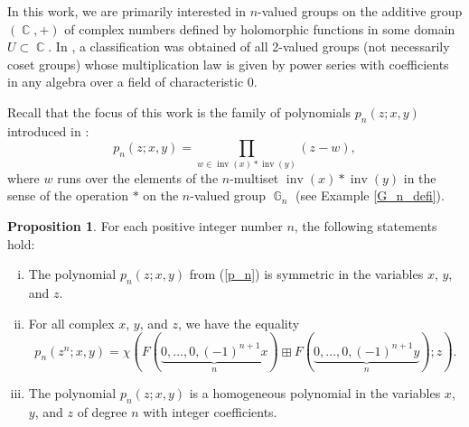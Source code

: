 \documentclass[14pt, dvipsnames]{extarticle}
\theoremstyle{definition}
\newtheorem{prop}{Proposition}
\theoremstyle{definition}
\theoremstyle{remark}
\DeclareMathOperator{\G}{\mathbb{G}}
\DeclareMathOperator{\inv}{\mathrm{inv}}
\DeclareMathOperator{\Cc}{\mathbb{C}}
\begin{document}
In this work, we are primarily interested in $n$-valued groups on the additive group $(\Cc, +)$ of complex numbers defined by holomorphic functions in some domain $U\subset \Cc$. In \cite{Buchstaber75}, a classification was obtained of all 2-valued groups (not necessarily coset groups) whose multiplication law is given by power series with coefficients in any algebra over a field of characteristic $0$.

Recall that the focus of this work is the family of polynomials $p_n(z; x, y)$ introduced in \cite{Buchstaber_Novikov}:
\begin{equation}\label{p_n}
p_n(z; x,y) = \prod\limits_{w\in \inv(x)\ast \inv(y)} (z - w),
\end{equation}
where $w$ runs over the elements of the $n$-multiset $\inv(x)\ast \inv(y)$ in the sense of the operation $\ast$ on the $n$-valued group $\G_n$ (see Example \ref{G_n_defi}).

\begin{prop}\label{prop10}
For each positive integer number $n$, the following statements hold:

\begin{enumerate}[(i)]

\item The polynomial $p_n(z; x, y)$ from (\ref{p_n}) is symmetric in the variables $x$, $y$, and $z$.

\item For all complex $x$, $y$, and $z$, we have the equality
$$p_n(z^n; x, y) = \chi(F(\underset{n}{\underbrace{0,\dots,0,(-1)^{n+1}x}})\boxplus F(\underset{n}{\underbrace{0,\dots,0,(-1)^{n+1}y}}); z).$$

\item The polynomial $p_n(z; x, y)$ is a homogeneous polynomial in the variables $x$, $y$, and $z$ of degree $n$ with integer coefficients.
\end{enumerate}

\end{prop}
\end{document}
